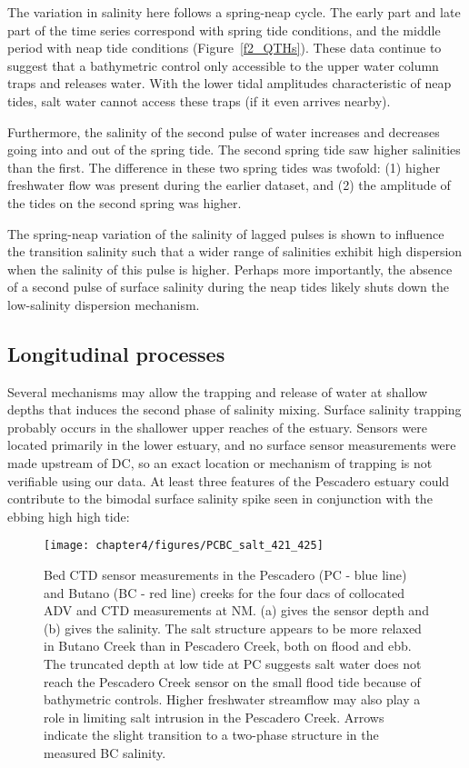 The variation in salinity here follows a spring-neap cycle. The early part and late part of the time series correspond with spring tide conditions, and the middle period with neap tide conditions (Figure~\ref{f2_QTHs}). These data continue to suggest that a bathymetric control only accessible to the upper water column traps and releases water. With the lower tidal amplitudes characteristic of neap tides, salt water cannot access these traps (if it even arrives nearby).  

Furthermore, the salinity of the second pulse of water increases and decreases going into and out of the spring tide. The second spring tide saw higher salinities than the first. The difference in these two spring tides was twofold: (1) higher freshwater flow was present during the earlier dataset, and (2) the amplitude of the tides on the second spring was higher. 

The spring-neap variation of the salinity of lagged pulses is shown to influence the transition salinity such that a wider range of salinities exhibit high dispersion when the salinity of this pulse is higher. Perhaps more importantly, the absence of a second pulse of surface salinity during the neap tides likely shuts down the low-salinity dispersion mechanism.  

\subsection{Longitudinal processes}

Several mechanisms may allow the trapping and release of water at shallow depths that induces the second phase of salinity mixing. Surface salinity trapping probably occurs in the shallower upper reaches of the estuary. Sensors were located primarily in the lower estuary, and no surface sensor measurements were made upstream of DC, so an exact location or mechanism of trapping is not verifiable using our data. At least three features of the Pescadero estuary could contribute to the bimodal surface salinity spike seen in conjunction with the ebbing high high tide:


\begin{figure}
	\texttt{[image: chapter4/figures/PCBC\_salt\_421\_425]}
	\caption{Bed CTD sensor measurements in the Pescadero (PC - blue line) and Butano (BC  - red line) creeks for the four dacs of collocated ADV and CTD measurements at NM. (a) gives the sensor depth and (b) gives the salinity. The salt structure appears to be more relaxed in Butano Creek than in Pescadero Creek, both on flood and ebb. The truncated depth at low tide at PC suggests salt water does not reach the Pescadero Creek sensor on the small flood tide because of bathymetric controls. Higher freshwater streamflow may also play a role in limiting salt intrusion in the Pescadero Creek. Arrows indicate the slight transition to a two-phase structure in the measured BC salinity.} \label{fig:PCBC421:425}
\end{figure}



